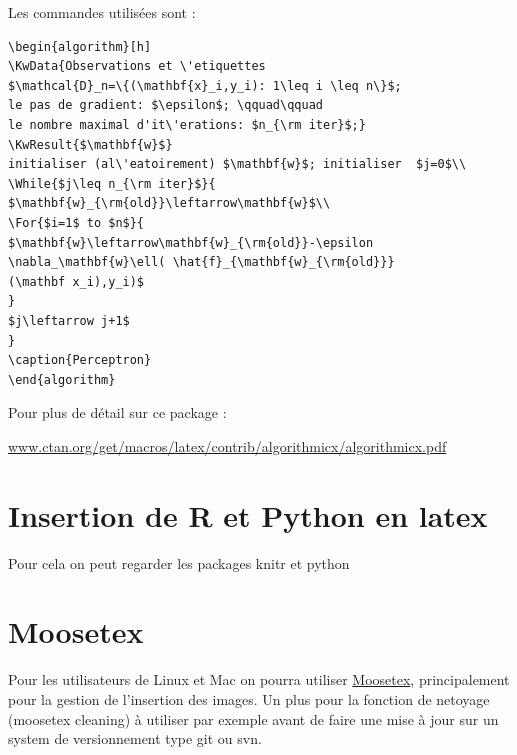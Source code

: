 Les commandes utilisées sont : 

\begin{lstlisting}
\begin{algorithm}[h]
\KwData{Observations et \'etiquettes 
$\mathcal{D}_n=\{(\mathbf{x}_i,y_i): 1\leq i \leq n\}$;
le pas de gradient: $\epsilon$; \qquad\qquad 
le nombre maximal d'it\'erations: $n_{\rm iter}$;}
\KwResult{$\mathbf{w}$}
initialiser (al\'eatoirement) $\mathbf{w}$; initialiser  $j=0$\\
\While{$j\leq n_{\rm iter}$}{
$\mathbf{w}_{\rm{old}}\leftarrow\mathbf{w}$\\
\For{$i=1$ to $n$}{
$\mathbf{w}\leftarrow\mathbf{w}_{\rm{old}}-\epsilon 
\nabla_\mathbf{w}\ell( \hat{f}_{\mathbf{w}_{\rm{old}}}
(\mathbf x_i),y_i)$
}
$j\leftarrow j+1$
}
\caption{Perceptron}
\end{algorithm}
\end{lstlisting}


\noindent Pour plus de détail sur ce package :

\noindent\url{www.ctan.org/get/macros/latex/contrib/algorithmicx/algorithmicx.pdf}

\section{Insertion de R et Python en latex}

Pour cela on peut regarder les packages knitr
et python


\section{Moosetex}

Pour les utilisateurs de Linux et Mac on pourra utiliser 
\href{http://www.math.u-bordeaux1.fr/~cdeledal/moosetex}{Moosetex},
principalement pour la gestion de l'insertion des images.
Un plus pour la fonction de netoyage (moosetex cleaning) \`a utiliser par exemple
avant de faire une mise \`a jour sur un system de versionnement type git ou svn.

